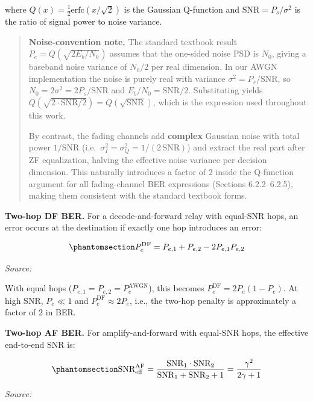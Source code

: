 where \(Q(x) = \frac{1}{2}\text{erfc}(x/\sqrt{2})\) is the Gaussian Q-function and \(\text{SNR} = P_s / \sigma^2\) is the ratio of signal power to noise variance.

\begin{quote}
\textbf{Noise-convention note.} The standard textbook result \(P_e = Q(\sqrt{2 E_b/N_0})\) assumes that the one-sided noise PSD is \(N_0\), giving a baseband noise variance of \(N_0/2\) per real dimension. In our AWGN implementation the noise is purely real with variance \(\sigma^2 = P_s/\text{SNR}\), so \(N_0 = 2\sigma^2 = 2P_s/\text{SNR}\) and \(E_b/N_0 = \text{SNR}/2\). Substituting yields \(Q(\sqrt{2 \cdot \text{SNR}/2}) = Q(\sqrt{\text{SNR}})\), which is the expression used throughout this work.

By contrast, the fading channels add \textbf{complex} Gaussian noise with total power \(1/\text{SNR}\) (i.e.~\(\sigma_I^2 = \sigma_Q^2 = 1/(2\,\text{SNR})\)) and extract the real part after ZF equalization, halving the effective noise variance per decision dimension. This naturally introduces a factor of 2 inside the Q-function argument for all fading-channel BER expressions (Sections 6.2.2--6.2.5), making them consistent with the standard textbook forms.
\end{quote}

\textbf{Two-hop DF BER.} For a decode-and-forward relay with equal-SNR hops, an error occurs at the destination if exactly one hop introduces an error:

\begin{equation}\protect\phantomsection\label{eq:df-ber-awgn}{P_e^{\text{DF}} = P_{e,1} + P_{e,2} - 2P_{e,1}P_{e,2}
}\end{equation} \par{\small\textit{Source: \cite{laneman2004cooperative}}}

With equal hops (\(P_{e,1} = P_{e,2} = P_e^{\text{AWGN}}\)), this becomes \(P_e^{\text{DF}} = 2P_e(1 - P_e)\). At high SNR, \(P_e \ll 1\) and \(P_e^{\text{DF}} \approx 2P_e\), i.e., the two-hop penalty is approximately a factor of 2 in BER.

\textbf{Two-hop AF BER.} For amplify-and-forward with equal-SNR hops, the effective end-to-end SNR is:

\begin{equation}\protect\phantomsection\label{eq:af-snr-eff}{\text{SNR}_{\text{eff}}^{\text{AF}} = \frac{\text{SNR}_1 \cdot \text{SNR}_2}{\text{SNR}_1 + \text{SNR}_2 + 1} = \frac{\gamma^2}{2\gamma + 1}
}\end{equation} \par{\small\textit{Source: \cite{laneman2004cooperative}}}

